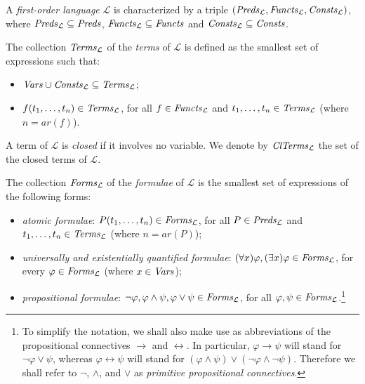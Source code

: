 \documentclass[manyauthors]{fundam}
\newcommand{\Lang}{\ensuremath{\mathcal{L}\xspace}} %
\newcommand{\LangPreds}{\Preds_{\Lang}}
\newcommand{\LangFuncts}{\Functs_{\Lang}}
\newcommand{\LangConsts}{\Consts_{\Lang}}
\newcommand{\LangTerms}{\Terms_{\Lang}}
\newcommand{\LangClTerms}{\ClTerms_{\Lang}}
\newcommand{\LangForms}{\Forms_{\Lang}}
\newcommand{\ar}{\mathit{ar}}
\newcommand{\nat}{\mathbb{N}}
\begin{document}
A \emph{first-order language} $\Lang$ is characterized by
a triple $(\LangPreds, \LangFuncts, \LangConsts)$, where
$\LangPreds \subseteq \Preds$, $\LangFuncts \subseteq \Functs$ and
$\LangConsts \subseteq \Consts$.

The collection $\LangTerms$ of the \emph{terms} of $\Lang$ is
defined as the smallest set of expressions such that:
\begin{itemize}
\item $\Vars \cup \LangConsts \subseteq \LangTerms$;

\item $f(t_1, \ldots, t_n) \in \LangTerms$, for all $f \in 
\LangFuncts$ and $t_1, \ldots, t_n \in \LangTerms$ (where $n = \ar(f)$).
\end{itemize}
A term of $\Lang$ is \emph{closed} if it involves no variable. We 
denote by $\LangClTerms$ the set of the closed terms of $\Lang$.

The collection $\LangForms$ of the \emph{formulae} of
$\Lang$ is the smallest set of expressions of the following forms:
\begin{itemize}
  \item \emph{atomic formulae}: $P(t_1, \ldots, t_n) \in \LangForms$, 
for all $P \in \LangPreds$ and $t_1, \ldots, t_n \in \LangTerms$ 
(where $n = \ar(P)$);
%

  \item \emph{universally and existentially quantified formulae}:
  $(\forall x)\varphi, (\exists x)\varphi \in \LangForms$, for every 
$\varphi \in \LangForms$ (where $x \in \mathit{Vars}$);

  \item \emph{propositional formulae}: $\neg \varphi, \varphi \wedge 
\psi,   \varphi \vee \psi \in \LangForms$, for all $\varphi, \psi \in 
\LangForms$.\footnote{To simplify the notation, we shall also make 
use as abbreviations of the propositional connectives $\rightarrow$ 
and $\leftrightarrow$. In particular, $\varphi \rightarrow \psi$ will 
stand for $\neg \varphi \vee \psi$, whereas $\varphi \leftrightarrow 
\psi$ will stand for $(\varphi \wedge \psi) \vee (\neg \varphi \wedge 
\neg\psi)$. Therefore we shall refer to $\neg$, $\wedge$, and $\vee$ 
as \emph{primitive propositional connectives}.}
%
\end{itemize}
\end{document}
